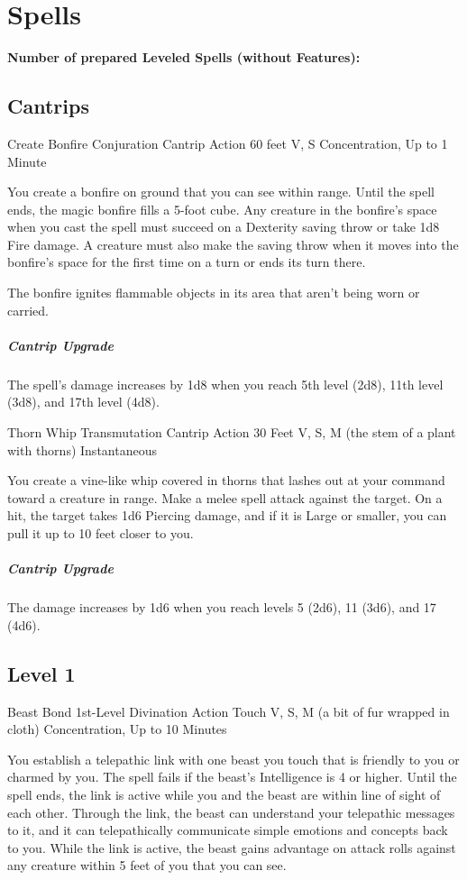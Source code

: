 \documentclass[letterpaper,openany,oneside,twocolumn]{book}
\begin{document}
\vfill\eject
\section*{Spells}
\textbf{Number of prepared Leveled Spells (without Features):} \intcalcAdd{\calculateModifier{\WisdomScoreValue}}{\LevelValue}
\subsection*{Cantrips}

\DndSpellHeader
  {Create Bonfire}
  {Conjuration Cantrip}
  {Action}
  {60 feet}
  {V, S}
  {Concentration, Up to 1 Minute}

You create a bonfire on ground that you can see within range. Until the spell ends, the magic bonfire fills a 5-foot cube. Any creature in the bonfire's space when you cast the spell must succeed on a Dexterity saving throw or take 1d8 Fire damage. A creature must also make the saving throw when it moves into the bonfire's space for the first time on a turn or ends its turn there.

The bonfire ignites flammable objects in its area that aren't being worn or carried.

\subparagraph*{Cantrip Upgrade} The spell's damage increases by 1d8 when you reach 5th level (2d8), 11th level (3d8), and 17th level (4d8).

\DndSpellHeader
  {Thorn Whip}
  {Transmutation Cantrip}
  {Action}
  {30 Feet}
  {V, S, M (the stem of a plant with thorns)}
  {Instantaneous}

You create a vine-like whip covered in thorns that lashes out at your command toward a creature in range. Make a melee spell attack against the target. On a hit, the target takes 1d6 Piercing damage, and if it is Large or smaller, you can pull it up to 10 feet closer to you.

\subparagraph*{Cantrip Upgrade} The damage increases by 1d6 when you reach levels 5 (2d6), 11 (3d6), and 17 (4d6).

\subsection*{Level 1}

\DndSpellHeader
  {Beast Bond}
  {1st-Level Divination}
  {Action}
  {Touch}
  {V, S, M (a bit of fur wrapped in cloth)}
  {Concentration, Up to 10 Minutes}

You establish a telepathic link with one beast you touch that is friendly to you or charmed by you. The spell fails if the beast's Intelligence is 4 or higher. Until the spell ends, the link is active while you and the beast are within line of sight of each other. Through the link, the beast can understand your telepathic messages to it, and it can telepathically communicate simple emotions and concepts back to you. While the link is active, the beast gains advantage on attack rolls against any creature within 5 feet of you that you can see.
\end{document}

